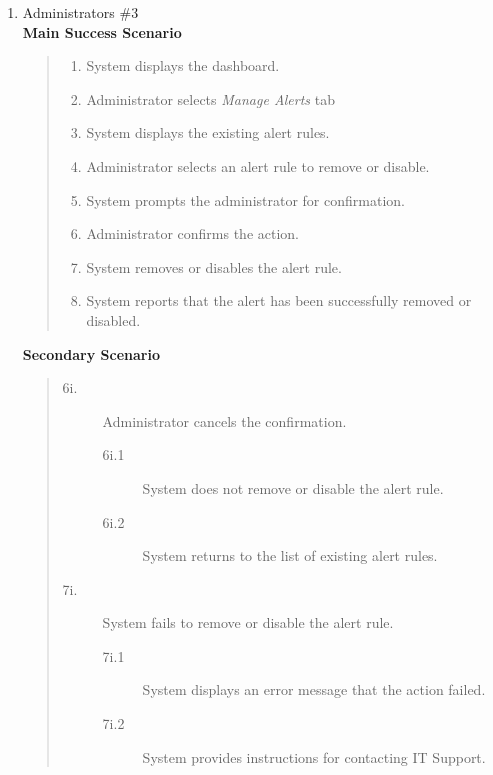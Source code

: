 \documentclass[]{article}
\begin{document}
\begin{enumerate}[{\bf BE3.}]
\begin{enumerate}[{\bf VP1.}]
			\item Administrators \#3 \\
				\textbf{Main Success Scenario} 
                    \begin{quote}
                    \begin{enumerate}[1.]
                        \item System displays the dashboard.
                        \item Administrator selects \textit{Manage Alerts} tab
                        \item System displays the existing alert rules.
                        \item Administrator selects an alert rule to remove or disable.
                        \item System prompts the administrator for confirmation.
                        \item Administrator confirms the action.
                        \item System removes or disables the alert rule.
                        \item System reports that the alert has been successfully removed or disabled.
                    \end{enumerate}
                    \end{quote}
                \textbf{Secondary Scenario} 
                \begin{quote}
                    \begin{description}
                        \item[\textmd{6i.}] Administrator cancels the confirmation.
                        \begin{description}
                            \item[\textmd{6i.1}] System does not remove or disable the alert rule.
                            \item[\textmd{6i.2}] System returns to the list of existing alert rules.
                        \end{description}
                        \item[\textmd{7i.}] System fails to remove or disable the alert rule.
                        \begin{description}
                            \item[\textmd{7i.1}] System displays an error message that the action failed.
                            \item[\textmd{7i.2}] System provides instructions for contacting IT Support.
                        \end{description}
                    \end{description}
                \end{quote}
                

\end{enumerate}
\end{enumerate}
\end{document}
